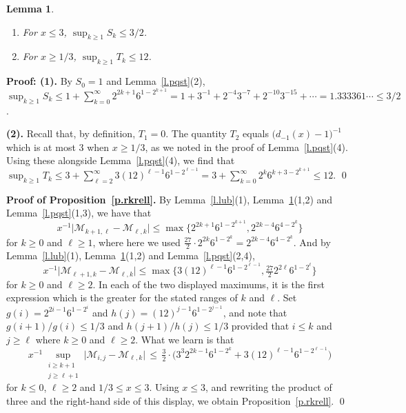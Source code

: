 \documentclass[letterpaper,11pt,oneside,reqno]{amsbook}
\numberwithin{figure}{chapter}
\newtheorem{lemma}[theorem]{Lemma}
\theoremstyle{definition}
\theoremstyle{definition}
\theoremstyle{definition}
\theoremstyle{definition}
\theoremstyle{definition}
\newcommand{\macdee}{d}
\newcommand{\minamm}{\mathcal{M}}
\begin{document}
\begin{lemma}\label{l.sup}
\leavevmode
\begin{enumerate}
\item For $x \leq 3$, $\sup_{k \geq 1} S_k \leq 3/2$.
\item For $x \geq 1/3$, $\sup_{k \geq 1} T_k \leq 12$.
\end{enumerate}
\end{lemma}
{\bf Proof: (1).}
By $S_0 =1$ and Lemma~\ref{l.pqst}(2), $\sup_{k \geq 1} S_k \leq 1 + \sum_{k=0}^\infty 2^{2k+1}6^{1-2^{k+1}} = 1 + 3^{-1} + 2^{-4}3^{-7} + 2^{-10}3^{-15} + \cdots = 1.333361\cdots \leq 3/2$.



{\bf (2).} Recall that, by definition, 
 $T_1 = 0$. The quantity $T_2$ equals  $\big(\macdee_{-1}(x) - 1\big)^{-1}$ which is at most $3$ when  $x \geq 1/3$, as we noted 
  in the proof of Lemma~\ref{l.pqst}(4). Using these alongside Lemma~\ref{l.pqst}(4), we find that 
  $\sup_{k \geq 1} T_k \leq 3 + \sum_{\ell = 2}^\infty  3 (12)^{\ell-1}  6^{1-2^{\ell-1}} = 3 + \sum_{k=0}^\infty 2^k 6^{k+3 - 2^{k+1}} \leq 12$. \qed 


{\bf Proof of Proposition~\ref{p.rkrell}.}
By Lemma~\ref{l.lub}(1), Lemma~\ref{l.sup}(1,2) and Lemma~\ref{l.pqst}(1,3), we have that
$$
 x^{-1} \big\vert \minamm_{k+1,\ell} - \minamm_{\ell,k} \big\vert \leq \max \big\{ 2^{2k +1} 6^{1 - 2^{k+1}} , 2^{2k-4} 6^{4-2^k} \big\}
$$
for $k \geq 0$ and $\ell \geq 1$, where here we used $\tfrac{27}{2} \cdot 2^{2k} 6^{1 - 2^k}  = 2^{2k-4} 6^{4-2^k}$. And by Lemma~\ref{l.lub}(1), Lemma~\ref{l.sup}(1,2) and Lemma~\ref{l.pqst}(2,4),
$$
 x^{-1} \big\vert \minamm_{\ell+1,k} - \minamm_{\ell,k} \big\vert \leq \max \big\{ 3 (12)^{\ell - 1} 6^{1 - 2^{\ell-1}} , \tfrac{27}{2} 2^{2\ell} 6^{1-2^\ell} \big\}
$$
for $k \geq 0$ and $\ell \geq 2$. In each of the two displayed maximums, it is the first expression which is the greater for the stated ranges of $k$ and $\ell$. 
Set $g(i) = 2^{2i-1} 6^{1-2^i}$ and $h(j) = (12)^{j-1} 6^{1 - 2^{j-1}}$, and note that $g(i+1)/g(i) \leq 1/3$ and $h(j+1)/h(j) \leq 1/3$ provided that
$i \leq k$ and $j \geq \ell$ where $k \geq 0$ and $\ell \geq 2$. What we learn is that
$$
 x^{-1} 
 \sup_{\substack{i \geq k+1 \\ j \geq \ell +1}}  \big\vert \minamm_{i,j} - \minamm_{\ell,k} \big\vert \, \leq \, \tfrac{3}{2} \cdot \Big( 3^3 2^{2k-1} 6^{1-2^k} + 3(12)^{\ell - 1} 6^{1-2^{\ell - 1}} \Big)
$$
for $k \leq 0$, $\ell \geq 2$ and $1/3 \leq x \leq 3$. Using $x \leq 3$, and rewriting the product of three and the right-hand side of this display, we obtain Proposition~\ref{p.rkrell}. \qed
\end{document}

